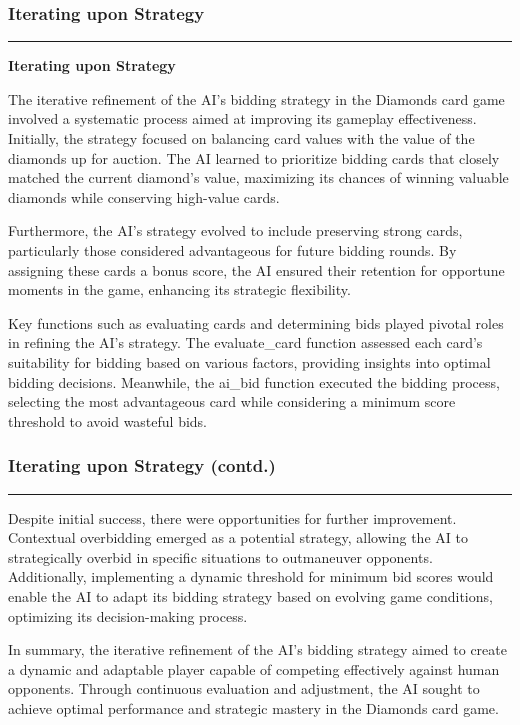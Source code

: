 \documentclass{article}
\begin{document}
\begin{frame}
\frametitle{\LARGE Iterating upon Strategy}
\vspace{0.5cm}
\centering
\textcolor{gray}{\rule{\linewidth}{0.5pt}}
{\centering\textbf{\LARGE Iterating upon Strategy}\par}

\raggedright
\Large
The iterative refinement of the AI's bidding strategy in the Diamonds card game involved a systematic process aimed at improving its gameplay effectiveness. Initially, the strategy focused on balancing card values with the value of the diamonds up for auction. The AI learned to prioritize bidding cards that closely matched the current diamond's value, maximizing its chances of winning valuable diamonds while conserving high-value cards.

\vspace{1cm}
Furthermore, the AI's strategy evolved to include preserving strong cards, particularly those considered advantageous for future bidding rounds. By assigning these cards a bonus score, the AI ensured their retention for opportune moments in the game, enhancing its strategic flexibility.

\vspace{1cm}
Key functions such as evaluating cards and determining bids played pivotal roles in refining the AI's strategy. The evaluate\_card function assessed each card's suitability for bidding based on various factors, providing insights into optimal bidding decisions. Meanwhile, the ai\_bid function executed the bidding process, selecting the most advantageous card while considering a minimum score threshold to avoid wasteful bids.

\vspace{1cm}
\end{frame}

\newpage
\begin{frame}
\frametitle{\LARGE Iterating upon Strategy (contd.)}
\vspace{0.5cm}
\centering
\textcolor{gray}{\rule{\linewidth}{0.5pt}}

\raggedright
\Large
Despite initial success, there were opportunities for further improvement. Contextual overbidding emerged as a potential strategy, allowing the AI to strategically overbid in specific situations to outmaneuver opponents. Additionally, implementing a dynamic threshold for minimum bid scores would enable the AI to adapt its bidding strategy based on evolving game conditions, optimizing its decision-making process.

\vspace{1cm}
In summary, the iterative refinement of the AI's bidding strategy aimed to create a dynamic and adaptable player capable of competing effectively against human opponents. Through continuous evaluation and adjustment, the AI sought to achieve optimal performance and strategic mastery in the Diamonds card game.

\vspace{1cm}
\end{frame}
\end{document}
